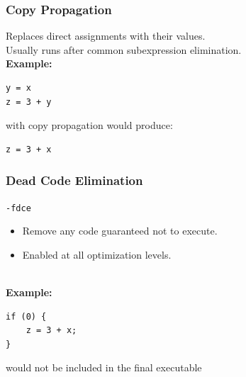 \documentclass[aspectratio=43]{beamer}
\newenvironment{changemargin}[1]{%
  \begin{list}{}{%
    \setlength{\topsep}{0pt}%
    \setlength{\leftmargin}{#1}%
    \setlength{\rightmargin}{1em}
    \setlength{\listparindent}{\parindent}%
    \setlength{\itemindent}{\parindent}%
    \setlength{\parsep}{\parskip}%
  }%
  \item[]}{\end{list}}
\begin{document}
\begin{frame}[fragile]
  \frametitle{Copy Propagation}

  \begin{changemargin}{2cm}
  Replaces direct assignments with their values. \\
  Usually runs after
  common subexpression elimination.\\[1em]

  {\bf Example:}
  \begin{lstlisting}
y = x
z = 3 + y
  \end{lstlisting}

  with copy propagation would produce:

  \begin{lstlisting}
z = 3 + x
  \end{lstlisting}
  \end{changemargin}
\end{frame}

\begin{frame}[fragile]
  \frametitle{Dead Code Elimination}

  \begin{changemargin}{2cm}
  {\tt -fdce}

  \begin{itemize}
    \item Remove any code guaranteed not to execute.
    \item Enabled at all optimization levels.
  \end{itemize}
~\\

  {\bf Example:}
  \begin{lstlisting}
if (0) {
    z = 3 + x;
}
  \end{lstlisting}
  would not be included in the final executable
  \end{changemargin}
\end{frame}
\end{document}
